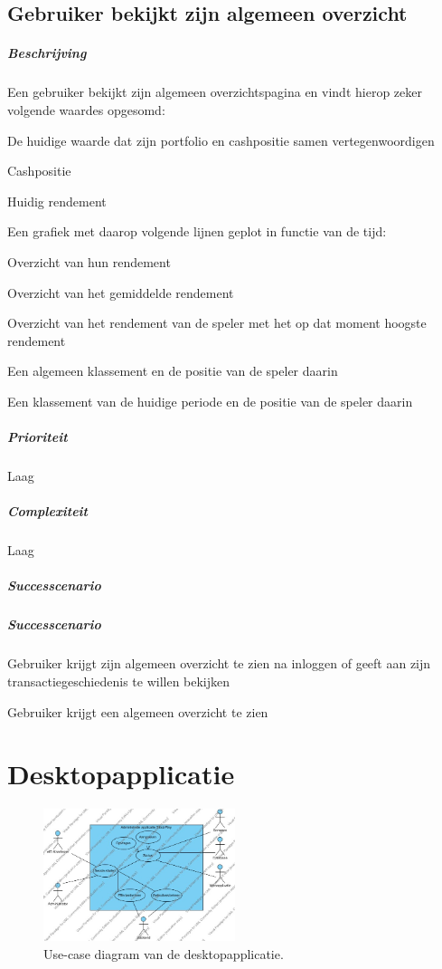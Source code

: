 \subsection{Gebruiker bekijkt zijn algemeen overzicht}
\begin{compact}
\subparagraph{Beschrijving} Een gebruiker bekijkt zijn algemeen overzichtspagina en vindt hierop zeker volgende waardes opgesomd:
\begin{itemize_compact}
	\item De huidige waarde dat zijn portfolio en cashpositie samen vertegenwoordigen
	\item Cashpositie
	\item Huidig rendement
	\item Een grafiek met daarop volgende lijnen geplot in functie van de tijd:
  \begin{itemize_compact}
  	\item  Overzicht van hun rendement
    \item Overzicht van het gemiddelde rendement
    \item Overzicht van het rendement van de speler met het op dat moment hoogste rendement
  \end{itemize_compact}
  \item Een algemeen klassement en de positie van de speler daarin
  \item Een klassement van de huidige periode en de positie van de speler daarin
\end{itemize_compact}
\subparagraph{Prioriteit}Laag
\subparagraph{Complexiteit}Laag
\subparagraph{Successcenario}
\subparagraph{Successcenario}
\begin{enumerate_compact}
 \item Gebruiker krijgt zijn algemeen overzicht te zien na inloggen of geeft aan zijn transactiegeschiedenis te willen bekijken
 \item Gebruiker krijgt een algemeen overzicht te zien
\end{enumerate_compact}
\end{compact}


\section{Desktopapplicatie}

\begin{figure}[h!]
	\centering
		\includegraphics[width=0.5\textwidth]{images/analyse/ucd_desktop}
	\caption{Use-case diagram van de desktopapplicatie.}
\end{figure}

